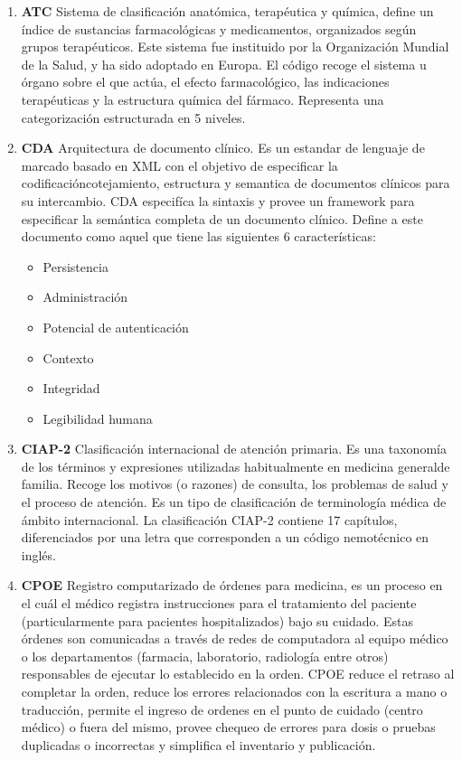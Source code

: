 {\begin{enumerate}
    \item\textbf{ATC} Sistema de clasificación anatómica, terapéutica y química, define un índice de sustancias farmacológicas y medicamentos, organizados según grupos terapéuticos. Este sistema fue instituido por la Organización Mundial de la Salud, y ha sido adoptado en Europa. El código recoge el sistema u órgano sobre el que actúa, el efecto farmacológico, las indicaciones terapéuticas y la estructura química del fármaco. Representa una categorización estructurada en 5 niveles.
    
    \item\textbf{CDA} Arquitectura de documento clínico. Es un estandar de lenguaje de marcado basado en XML con el objetivo de especificar la codificación\/cotejamiento, estructura y semantica de documentos clínicos para su intercambio. CDA especifíca la sintaxis y provee un framework para especificar la semántica completa de un documento clínico. Define a este documento como aquel que tiene las siguientes 6 características:
      \begin{itemize}
          \item Persistencia
          \item Administración
          \item Potencial de autenticación
          \item Contexto
    	  \item Integridad
   		  \item Legibilidad humana
      \end{itemize}
      
    \item\textbf{CIAP-2} Clasificación internacional de atención primaria. Es una taxonomía de los términos y expresiones utilizadas habitualmente en medicina general\/de familia. Recoge los motivos (o razones) de consulta, los problemas de salud y el proceso de atención. Es un tipo de clasificación de terminología médica de ámbito internacional. La clasificación CIAP-2 contiene 17 capítulos, diferenciados por una letra que corresponden a un código nemotécnico en inglés.
    
    \item\textbf{CPOE} Registro computarizado de órdenes para medicina, es un proceso en el cuál el médico registra instrucciones para el tratamiento del paciente (particularmente para pacientes hospitalizados) bajo su cuidado. Estas órdenes son comunicadas a través de redes de computadora al equipo médico o los departamentos (farmacia, laboratorio, radiología entre otros) responsables de ejecutar lo establecido en la orden. CPOE reduce el retraso al completar la orden, reduce los errores relacionados con la escritura a mano o traducción, permite el ingreso de ordenes en el punto de cuidado (centro médico) o fuera del mismo, provee chequeo de errores para dosis o pruebas duplicadas o incorrectas y simplifica el inventario y publicación.
    

\end{enumerate}}
